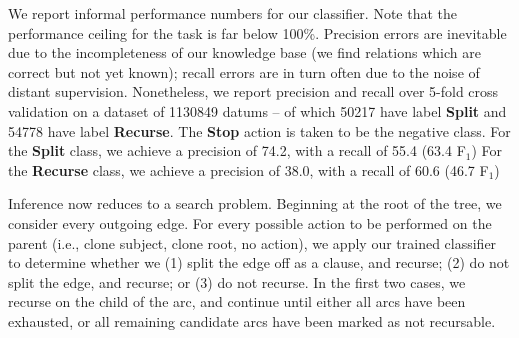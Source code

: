 We report informal performance numbers for our classifier.
Note that the performance ceiling for the task is far below 100\%.
Precision errors are inevitable due to the incompleteness of our
  knowledge base (we find relations which are correct but not yet known);
  recall errors are in turn often due to the noise of distant supervision.
Nonetheless, we report precision and recall
  over 5-fold cross validation on a dataset of
  \num{1130849} datums -- of which \num{50217} have label \textbf{Split} and
  \num{54778} have label \textbf{Recurse}.
The \textbf{Stop} action is taken to be the negative class.
For the \textbf{Split} class, we achieve a precision of 74.2, with a recall
  of 55.4 (63.4 F$_1$)
For the \textbf{Recurse} class, we achieve a precision of 38.0, with a recall
  of 60.6 (46.7 F$_1$)

Inference now reduces to a search problem.
Beginning at the root of the tree, we consider every outgoing edge.
  For every possible action to be performed on the parent (i.e., clone subject,
  clone root, no action), we apply our trained classifier to determine
  whether we 
  (1) split the edge off as a clause, and recurse;
  (2) do not split the edge, and recurse; or 
  (3) do not recurse.
In the first two cases, we recurse on the child of the arc, and continue until
  either all arcs have been exhausted, or all remaining candidate arcs
  have been marked as not recursable.

